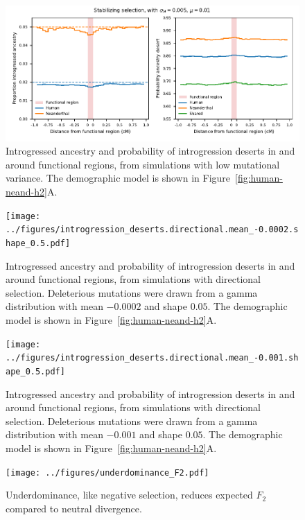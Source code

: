 \documentclass[]{article}
\begin{document}
\begin{figure}[ht!]
    \centering
    \includegraphics{../figures/introgression_deserts.SD_0.005.pdf}
    \caption{
        Introgressed ancestry and probability of introgression deserts in and
        around functional regions, from simulations with low mutational variance.
        The demographic model is shown in Figure~\ref{fig:human-neand-h2}A.
    }
    \label{fig:deserts-low-VM}
\end{figure}

\begin{figure}[ht!]
    \centering
    \texttt{[image: ../figures/introgression\_deserts.directional.mean\_-0.0002.shape\_0.5.pdf]}
    \caption{
        Introgressed ancestry and probability of introgression deserts in and
        around functional regions, from simulations with directional selection.
        Deleterious mutations were drawn from a gamma distribution with mean
        $-0.0002$ and shape $0.05$.
        The demographic model is shown in Figure~\ref{fig:human-neand-h2}A.
    }
    \label{fig:deserts-directional-A}
\end{figure}

\begin{figure}[ht!]
    \centering
    \texttt{[image: ../figures/introgression\_deserts.directional.mean\_-0.001.shape\_0.5.pdf]}
    \caption{
        Introgressed ancestry and probability of introgression deserts in and
        around functional regions, from simulations with directional selection.
        Deleterious mutations were drawn from a gamma distribution with mean
        $-0.001$ and shape $0.05$.
        The demographic model is shown in Figure~\ref{fig:human-neand-h2}A.
    }
    \label{fig:deserts-directional-B}
\end{figure}


\begin{figure}[ht!]
    \centering
    \texttt{[image: ../figures/underdominance\_F2.pdf]}
    \caption{
        Underdominance, like negative selection, reduces expected $F_2$ compared
        to neutral divergence.
    }
    \label{fig:underdominance-F2}
\end{figure}
\end{document}
